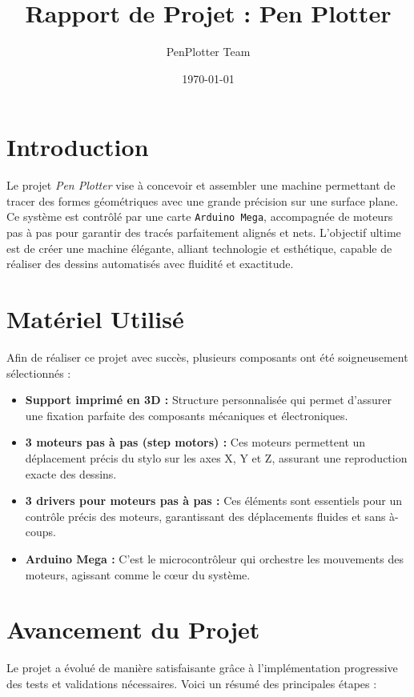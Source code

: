 \documentclass[12pt,a4paper]{article}
\title{\vspace{-1.8cm} \textbf{\huge Rapport de Projet : {\color{rose} Pen Plotter}} \vspace{-0.3cm}}
\author{\textsf{\color{softpurple} PenPlotter Team}}
\date{\today}
\newcommand{\fancyline}{
    \begin{tikzpicture}[remember picture, overlay]
        \draw[ultra thick, softpurple, decorate, decoration={snake, amplitude=.4mm, segment length=10mm}] 
        (current page.west) -- (current page.east);
    \end{tikzpicture}
}
\begin{document}
\maketitle
\thispagestyle{fancy} 

\vspace{0.5cm}

\section{Introduction}
\textsf{Le projet \textit{Pen Plotter} vise à concevoir et assembler une machine permettant de tracer des formes géométriques avec une grande précision sur une surface plane. Ce système est contrôlé par une carte \texttt{Arduino Mega}, accompagnée de moteurs pas à pas pour garantir des tracés parfaitement alignés et nets. L'objectif ultime est de créer une machine élégante, alliant technologie et esthétique, capable de réaliser des dessins automatisés avec fluidité et exactitude.}

\section{Matériel Utilisé}
\textsf{Afin de réaliser ce projet avec succès, plusieurs composants ont été soigneusement sélectionnés :}

\begin{itemize}
    \item \textbf{Support imprimé en 3D :} Structure personnalisée qui permet d'assurer une fixation parfaite des composants mécaniques et électroniques.
    \item \textbf{3 moteurs pas à pas (step motors) :} Ces moteurs permettent un déplacement précis du stylo sur les axes X, Y et Z, assurant une reproduction exacte des dessins.
    \item \textbf{3 drivers pour moteurs pas à pas :} Ces éléments sont essentiels pour un contrôle précis des moteurs, garantissant des déplacements fluides et sans à-coups.
    \item \textbf{Arduino Mega :} C'est le microcontrôleur qui orchestre les mouvements des moteurs, agissant comme le cœur du système.
\end{itemize}

\section{Avancement du Projet}
\textsf{Le projet a évolué de manière satisfaisante grâce à l'implémentation progressive des tests et validations nécessaires. Voici un résumé des principales étapes :}
\end{document}
